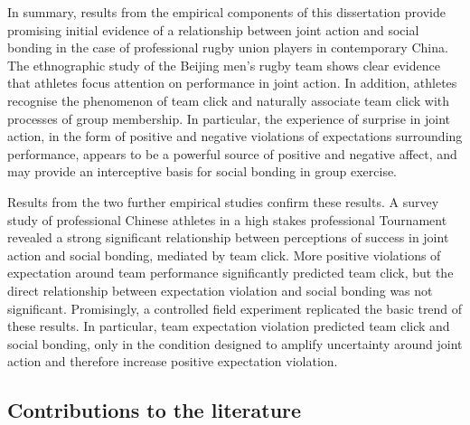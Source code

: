 In summary, results from the empirical components of this dissertation provide promising initial evidence of a relationship between joint action and social bonding in the case of professional rugby union players in contemporary China.  The ethnographic study of the Beijing men's rugby team shows clear evidence that athletes focus attention on performance in joint action.  In addition, athletes recognise the phenomenon of team click and naturally associate team click with processes of group membership.  In particular, the experience of surprise in joint action, in the form of positive and negative violations of expectations surrounding performance, appears to be a powerful source of positive and negative affect, and may provide an interceptive basis for social bonding in group exercise.

Results from the two further empirical studies confirm these results.  A survey study of professional Chinese athletes in a high stakes professional Tournament revealed a strong significant relationship between perceptions of success in joint action and social bonding, mediated by team click. More positive violations of expectation around team performance significantly predicted team click, but the direct relationship between expectation violation and social bonding was not significant.  Promisingly, a controlled field experiment replicated the basic trend of these results.  In particular, team expectation violation predicted team click and social bonding, only in the condition designed to amplify uncertainty around joint action and therefore increase positive expectation violation.


  \subsection{Contributions to the literature}

